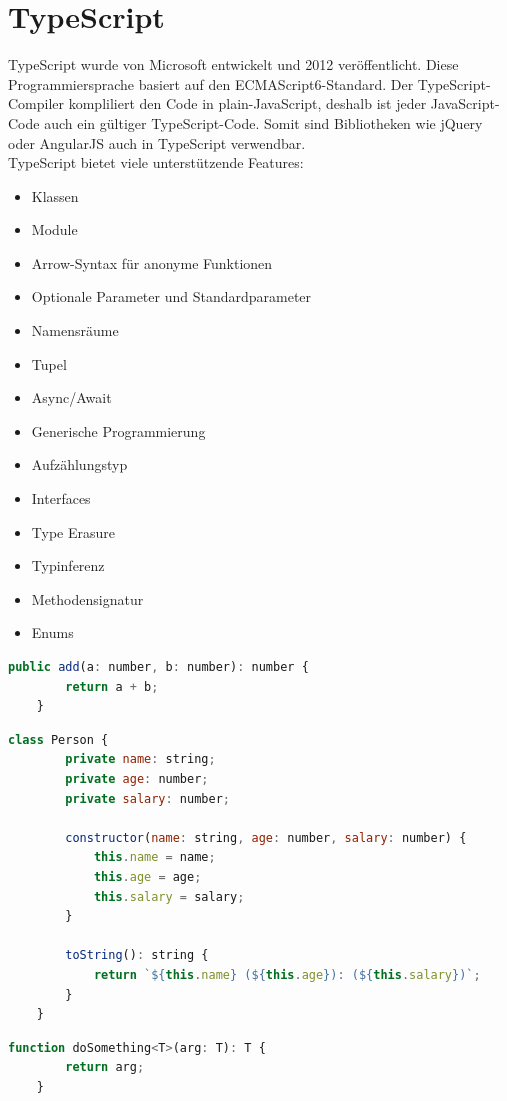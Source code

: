 \section{TypeScript}
TypeScript wurde von Microsoft entwickelt und 2012 veröffentlicht. Diese Programmiersprache basiert auf den ECMAScript6-Standard. Der TypeScript-Compiler kompliliert den Code in plain-JavaScript, deshalb ist jeder JavaScript-Code auch ein gültiger TypeScript-Code. Somit sind Bibliotheken wie jQuery oder AngularJS auch in TypeScript verwendbar. \autocite{wikiTypeScript} \\

TypeScript bietet viele unterstützende Features:

\begin{itemize}
	\item Klassen
	\item Module
	\item Arrow-Syntax für anonyme Funktionen
	\item Optionale Parameter und Standardparameter
	\item Namensräume
	\item Tupel
	\item Async/Await
	\item Generische Programmierung
	\item Aufzählungstyp
	\item Interfaces
	\item Type Erasure
	\item Typinferenz
	\item Methodensignatur
	\item Enums
\end{itemize}

\begin{lstlisting}[caption={TypeScript-Beispiel Function}, language=JavaScript]
	public add(a: number, b: number): number {
		return a + b;
	}
\end{lstlisting}

\begin{lstlisting}[caption={TypeScript-Beispiel Klasse},captionpos=b, language=JavaScript]
	class Person {
		private name: string;
		private age: number;
		private salary: number;
		
		constructor(name: string, age: number, salary: number) {
			this.name = name;
			this.age = age;
			this.salary = salary;
		}
		
		toString(): string {
			return `${this.name} (${this.age}): (${this.salary})`;
		}
	}
\end{lstlisting}
\begin{lstlisting}[caption={TypeScript-Beispiel Generische Programmierung}, language=JavaScript]
	function doSomething<T>(arg: T): T {
		return arg;
	}
\end{lstlisting}

